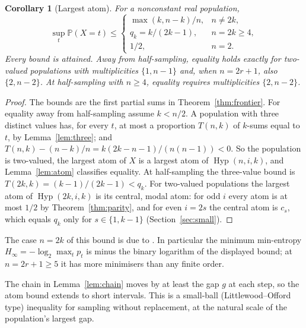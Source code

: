 \documentclass[11pt]{article}
\newtheorem{corollary}[theorem]{Corollary}
\theoremstyle{remark}
\newcommand{\Prb}{\mathbb P}
\newcommand{\Hyp}{\operatorname{Hyp}}
\begin{document}
\begin{corollary}[Largest atom]\label{cor:concentration}
For a nonconstant real population,
\[
 \sup_t\Prb(X=t)\le
 \begin{cases}
 \max(k,n-k)/n,&n\ne2k,\\
 q_k=k/(2k-1),&n=2k\ge4,\\
 1/2,&n=2.
 \end{cases}
\]
Every bound is attained. Away from half-sampling, equality holds exactly for
two-valued populations with multiplicities \(\{1,n-1\}\) and, when
\(n=2r+1\), also \(\{2,n-2\}\). At half-sampling with \(n\ge4\), equality
requires multiplicities \(\{2,n-2\}\).
\end{corollary}
\begin{proof}
The bounds are the first partial sums in Theorem~\ref{thm:frontier}. For
equality away from half-sampling assume \(k<n/2\). A population with three
distinct values has, for every \(t\), at most a proportion \(T(n,k)\) of
\(k\)-sums equal to \(t\), by Lemma~\ref{lem:three}; and
\(T(n,k)-(n-k)/n=k(2k-n-1)/(n(n-1))<0\). So the population is two-valued, the
largest atom of \(X\) is a largest atom of \(\Hyp(n,i,k)\), and
Lemma~\ref{lem:atom} classifies equality. At half-sampling the three-value
bound is \(T(2k,k)=(k-1)/(2k-1)<q_k\). For two-valued populations the largest
atom of \(\Hyp(2k,i,k)\) is its central, modal atom: for odd \(i\) every atom
is at most \(1/2\) by Theorem~\ref{thm:parity}, and for even \(i=2s\) the
central atom is \(c_s\), which equals \(q_k\) only for \(s\in\{1,k-1\}\)
(Section~\ref{sec:small}).
\end{proof}

The case \(n=2k\) of this bound is due to \cite{MVV}. In particular the
minimum min-entropy \(H_\infty=-\log_2\max_tp_t\) is minus the binary logarithm
of the displayed bound; at \(n=2r+1\ge5\) it has more minimisers than any
finite order.

The chain in Lemma~\ref{lem:chain} moves by at least the gap \(g\) at each
step, so the atom bound extends to short intervals. This is a small-ball
(Littlewood--Offord type) inequality for sampling without replacement, at the
natural scale of the population's largest gap.
\end{document}
